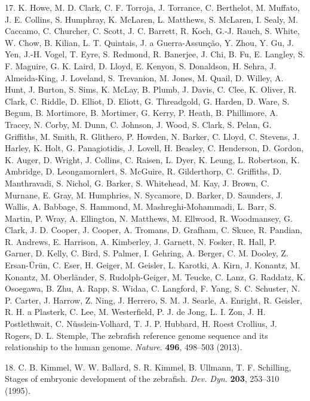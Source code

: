 \documentclass[11pt,singlespacinge,twoside]{reedthesis} %
\begin{document}
\leavevmode\hypertarget{ref-Howe2013a}{}%
17. K. Howe, M. D. Clark, C. F. Torroja, J. Torrance, C. Berthelot, M. Muffato, J. E. Collins, S. Humphray, K. McLaren, L. Matthews, S. McLaren, I. Sealy, M. Caccamo, C. Churcher, C. Scott, J. C. Barrett, R. Koch, G.-J. Rauch, S. White, W. Chow, B. Kilian, L. T. Quintais, J. a Guerra-Assunção, Y. Zhou, Y. Gu, J. Yen, J.-H. Vogel, T. Eyre, S. Redmond, R. Banerjee, J. Chi, B. Fu, E. Langley, S. F. Maguire, G. K. Laird, D. Lloyd, E. Kenyon, S. Donaldson, H. Sehra, J. Almeida-King, J. Loveland, S. Trevanion, M. Jones, M. Quail, D. Willey, A. Hunt, J. Burton, S. Sims, K. McLay, B. Plumb, J. Davis, C. Clee, K. Oliver, R. Clark, C. Riddle, D. Elliot, D. Eliott, G. Threadgold, G. Harden, D. Ware, S. Begum, B. Mortimore, B. Mortimer, G. Kerry, P. Heath, B. Phillimore, A. Tracey, N. Corby, M. Dunn, C. Johnson, J. Wood, S. Clark, S. Pelan, G. Griffiths, M. Smith, R. Glithero, P. Howden, N. Barker, C. Lloyd, C. Stevens, J. Harley, K. Holt, G. Panagiotidis, J. Lovell, H. Beasley, C. Henderson, D. Gordon, K. Auger, D. Wright, J. Collins, C. Raisen, L. Dyer, K. Leung, L. Robertson, K. Ambridge, D. Leongamornlert, S. McGuire, R. Gilderthorp, C. Griffiths, D. Manthravadi, S. Nichol, G. Barker, S. Whitehead, M. Kay, J. Brown, C. Murnane, E. Gray, M. Humphries, N. Sycamore, D. Barker, D. Saunders, J. Wallis, A. Babbage, S. Hammond, M. Mashreghi-Mohammadi, L. Barr, S. Martin, P. Wray, A. Ellington, N. Matthews, M. Ellwood, R. Woodmansey, G. Clark, J. D. Cooper, J. Cooper, A. Tromans, D. Grafham, C. Skuce, R. Pandian, R. Andrews, E. Harrison, A. Kimberley, J. Garnett, N. Fosker, R. Hall, P. Garner, D. Kelly, C. Bird, S. Palmer, I. Gehring, A. Berger, C. M. Dooley, Z. Ersan-Ürün, C. Eser, H. Geiger, M. Geisler, L. Karotki, A. Kirn, J. Konantz, M. Konantz, M. Oberländer, S. Rudolph-Geiger, M. Teucke, C. Lanz, G. Raddatz, K. Osoegawa, B. Zhu, A. Rapp, S. Widaa, C. Langford, F. Yang, S. C. Schuster, N. P. Carter, J. Harrow, Z. Ning, J. Herrero, S. M. J. Searle, A. Enright, R. Geisler, R. H. a Plasterk, C. Lee, M. Westerfield, P. J. de Jong, L. I. Zon, J. H. Postlethwait, C. Nüsslein-Volhard, T. J. P. Hubbard, H. Roest Crollius, J. Rogers, D. L. Stemple, The zebrafish reference genome sequence and its relationship to the human genome. \emph{Nature}. \textbf{496}, 498--503 (2013).

\leavevmode\hypertarget{ref-Kimmel1995a}{}%
18. C. B. Kimmel, W. W. Ballard, S. R. Kimmel, B. Ullmann, T. F. Schilling, Stages of embryonic development of the zebrafish. \emph{Dev. Dyn.} \textbf{203}, 253--310 (1995).
\end{document}
